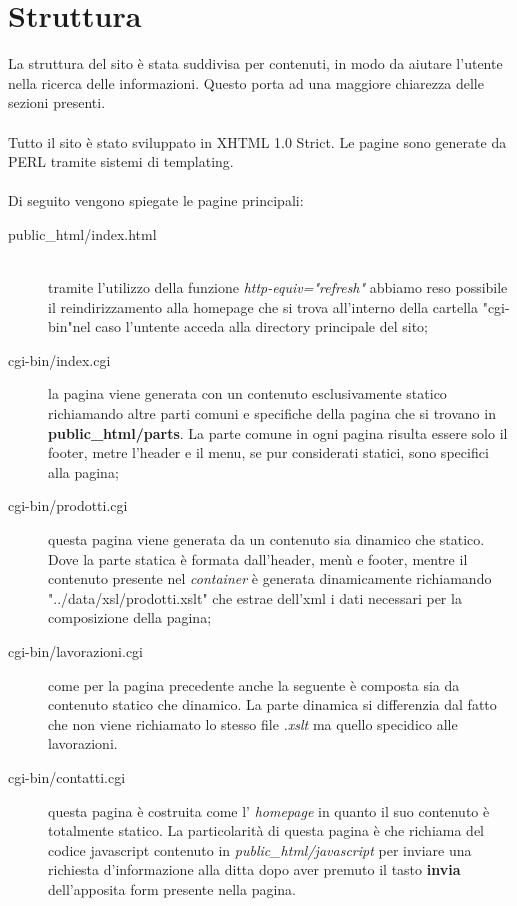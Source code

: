 \documentclass[11pt]{article}
\begin{document}
\section{Struttura}
La struttura del sito è stata suddivisa per contenuti, in modo da aiutare l'utente nella ricerca delle informazioni. Questo porta ad una maggiore chiarezza delle sezioni presenti.
\\
\\
Tutto il sito è stato sviluppato in XHTML 1.0 Strict. Le pagine sono generate da PERL tramite sistemi di templating.
\\
\\Di seguito vengono spiegate le pagine principali:
\\
\begin{description}
	\item[public\_html/index.html] \hfill \\
	 tramite l'utilizzo della funzione \textit{http-equiv="refresh"} abbiamo reso possibile il reindirizzamento alla homepage che si trova all’interno della cartella "cgi-bin"nel caso l'untente acceda alla directory principale del sito;
	 \item[cgi-bin/index.cgi]  la pagina viene generata con un contenuto esclusivamente statico richiamando altre parti comuni e specifiche della pagina che si trovano in \textbf{public\_html/parts}. La parte comune in ogni pagina risulta essere solo il footer, metre l'header e il menu, se pur considerati statici, sono specifici alla pagina;
	 \item[cgi-bin/prodotti.cgi]  questa pagina viene generata da un contenuto sia dinamico che statico. Dove la parte statica è formata dall'header, menù e footer, mentre il contenuto presente nel \textit{container} è generata dinamicamente richiamando "../data/xsl/prodotti.xslt" che estrae dell'xml i dati necessari per la composizione della pagina;
	 \item[cgi-bin/lavorazioni.cgi]  come per la pagina precedente anche la seguente è composta sia da contenuto statico che dinamico. La parte dinamica si differenzia dal fatto che non viene richiamato lo stesso file \textit{.xslt} ma quello specidico alle lavorazioni. 
	 \item[cgi-bin/contatti.cgi] questa pagina è costruita come l' \textit{homepage} in quanto il suo contenuto è totalmente statico. La particolarità di questa pagina è che richiama del codice javascript contenuto in \textit{public\_html/javascript} per inviare una richiesta d'informazione alla ditta dopo aver premuto il tasto \textbf{invia} dell'apposita form presente nella pagina.

\end{description}
\end{document}
